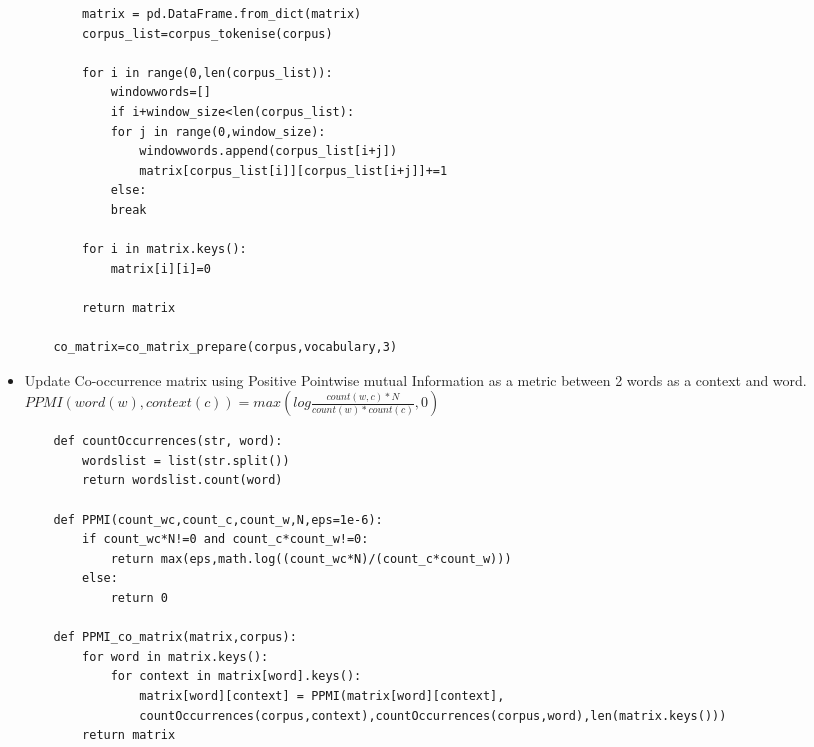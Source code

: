 \documentclass{book}
\begin{document}
\begin{itemize}
\begin{verbatim}
		matrix = pd.DataFrame.from_dict(matrix)
		corpus_list=corpus_tokenise(corpus)
		
		for i in range(0,len(corpus_list)):
			windowwords=[]
			if i+window_size<len(corpus_list):
			for j in range(0,window_size):
				windowwords.append(corpus_list[i+j])
				matrix[corpus_list[i]][corpus_list[i+j]]+=1
			else:
			break
		
		for i in matrix.keys():
			matrix[i][i]=0
		
		return matrix

	co_matrix=co_matrix_prepare(corpus,vocabulary,3)
	\end{verbatim} 
	\item Update Co-occurrence matrix using Positive Pointwise mutual Information as a metric between 2 words as a context and word.
	\subitem $PPMI(word(w),context(c))=max(log\frac{count(w,c)*N}{count(w)*count(c)},0)$ 
	\subitem 
	\begin{verbatim}
	def countOccurrences(str, word):
		wordslist = list(str.split())
		return wordslist.count(word)

	def PPMI(count_wc,count_c,count_w,N,eps=1e-6):
		if count_wc*N!=0 and count_c*count_w!=0:
			return max(eps,math.log((count_wc*N)/(count_c*count_w)))
		else:
			return 0

	def PPMI_co_matrix(matrix,corpus):
		for word in matrix.keys():
			for context in matrix[word].keys():
				matrix[word][context] = PPMI(matrix[word][context],
				countOccurrences(corpus,context),countOccurrences(corpus,word),len(matrix.keys()))
		return matrix
	

\end{verbatim}
\end{itemize}
\end{document}
